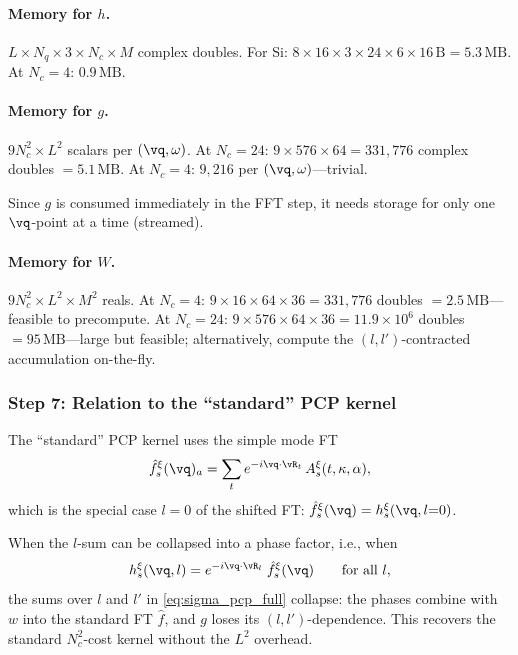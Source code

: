 \paragraph{Memory for $h$.}
$L \times N_q \times 3 \times N_c \times M$ complex doubles.
For Si: $8 \times 16 \times 3 \times 24 \times 6 \times 16\,\text{B}
= 5.3\,\text{MB}$.  At $N_c = 4$: $0.9\,\text{MB}$.

\paragraph{Memory for $g$.}
$9 N_c^2 \times L^2$ scalars per $(\vq, \omega)$.  At $N_c = 24$:
$9 \times 576 \times 64 = 331{,}776$ complex doubles $= 5.1\,\text{MB}$.
At $N_c = 4$: $9{,}216$ per $(\vq,\omega)$---trivial.

Since $g$ is consumed immediately in the FFT step, it needs
storage for only one $\vq$-point at a time (streamed).

\paragraph{Memory for $W$.}
$9 N_c^2 \times L^2 \times M^2$ reals.
At $N_c = 4$: $9 \times 16 \times 64 \times 36 = 331{,}776$
doubles $= 2.5\,\text{MB}$---feasible to precompute.
At $N_c = 24$: $9 \times 576 \times 64 \times 36 = 11.9\times10^6$
doubles $= 95\,\text{MB}$---large but feasible; alternatively,
compute the $(l,l')$-contracted accumulation on-the-fly.


\subsubsection{Step 7: Relation to the ``standard'' PCP kernel}
\label{sssub:relation}

The ``standard'' PCP kernel uses the simple mode FT
\begin{equation}
  \hat{f}_s^\xi(\vq)_a
  = \sum_t e^{-i\vq \cdot \vR_t}\, A_s^\xi(t, \kappa, \alpha),
\end{equation}
which is the special case $l = 0$ of the shifted FT:
$\hat{f}_s^\xi(\vq) = h_s^\xi(\vq, l{=}0)$.

When the $l$-sum can be collapsed into a phase factor, i.e., when
\begin{equation}\label{eq:shift_identity}
  h_s^\xi(\vq, l) = e^{-i\vq\cdot\vR_l}\; \hat{f}_s^\xi(\vq)
  \qquad\text{for all } l,
\end{equation}
the sums over $l$ and $l'$ in \cref{eq:sigma_pcp_full} collapse:
the phases combine with $w$ into the standard FT $\hat{f}$, and
$g$ loses its $(l,l')$-dependence.  This recovers the standard
$N_c^2$-cost kernel without the $L^2$ overhead.

